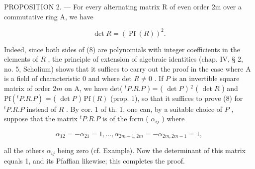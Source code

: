 PROPOSITION 2. --- For every alternating matrix R of even order 2m over a commutative ring A, we have

\[
\det R = (\operatorname{Pf} (R)) ^ {2}.\tag{8}
\]

Indeed, since both sides of (8) are polynomials with integer coefficients in the elements of \(R\) , the principle of extension of algebraic identities (chap. IV, § 2, no. 5, Scholium) shows that it suffices to carry out the proof in the case where A is a field of characteristic 0 and where det \(R \neq 0\) . If \(P\) is an invertible square matrix of order \(2m\) on A, we have det( \(^{t}P.R.P\) ) = ( \(\det P\) ) \(^{2}\) ( \(\det R\) ) and \(\mathrm{Pf}(^{t}P.R.P)\) = ( \(\det P\) ) \(\mathrm{Pf}(R)\) (prop. 1), so that it suffices to prove (8) for \(^{t}P.R.P\) instead of \(R\) . By cor. 1 of th. 1, one can, by a suitable choice of \(P\) , suppose that the matrix \(^{t}P.R.P\) is of the form ( \(\alpha_{ij}\) ) where

\[
\alpha_ {1 2} = - \alpha_ {2 1} = 1, \dots , \alpha_ {2 m - 1, 2 m} = - \alpha_ {2 m, 2 m - 1} = 1,
\]

all the others \(\alpha_{ij}\) being zero (cf. Example). Now the determinant of this matrix equals 1, and its Pfaffian likewise; this completes the proof.

